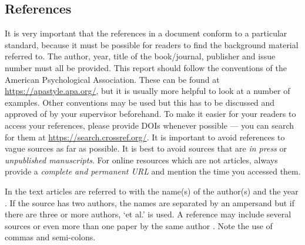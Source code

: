 \subsection{References}\label{sec:_references}
It is very important that the references in a document conform to a particular standard, because it must be possible for readers to find the background material referred to.
The author, year, title of the book/journal, publisher and issue number must all be provided.
This report should follow the conventions of the American Psychological Association.
These can be found at \url{https://apastyle.apa.org/}, but it is usually more helpful to look at a number of examples.
Other conventions may be used but this has to be discussed and approved of by your supervisor beforehand.
To make it easier for your readers to access your references, please provide DOIs whenever possible --- you can search for them at \url{https://search.crossref.org/}.
It is important to avoid references to vague sources as far as possible.
It is best to avoid sources that are \emph{in press} or \emph{unpublished manuscripts}.
For online resources which are not articles, always provide a \emph{complete and permanent URL} and mention the time you accessed them.

In the text articles are referred to with the name(s) of the author(s) and the year \citep{dawkins76}.
If the source has two authors, the names are separated by an ampersand \citep{berrah99} but if there are three or more authors, ‘et al.’ is used\citep{schwartz97}.
A reference may include several sources \citep{cooper52, Crothers78} or even more than one paper by the same author \citep{Kirby98, Kirby99, Kirby00, Oliphant93, Oliphant96}.
Note the use of commas and semi-colons.
